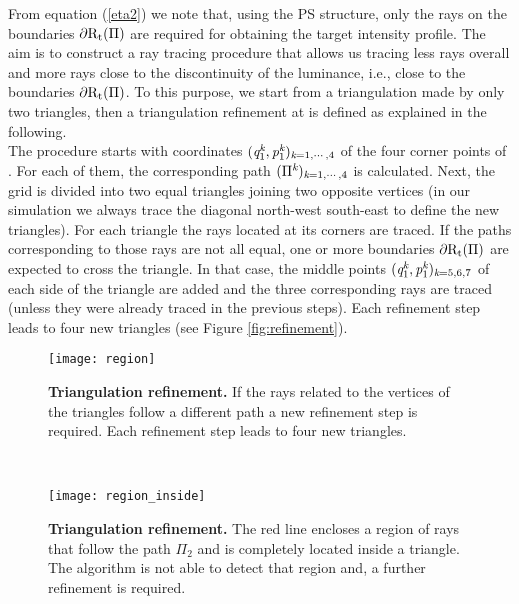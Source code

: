 From equation (\ref{eta2}) we note that, using the PS structure, only the rays on the boundaries $\partial\mbox{$\textup{R}$}_\textrm{t}(\Pi)$ are required for obtaining the target intensity profile.
The aim is to construct a ray tracing procedure that allows us tracing less rays overall and more rays close to the discontinuity of the luminance, i.e., close to the boundaries $\partial\mbox{$\textup{R}$}_\textrm{t}(\Pi)$.
To this purpose, we start from a triangulation made by only two triangles, then a triangulation refinement at  is defined as explained in the following. \\ \indent
The procedure starts with coordinates $(\textit{q}_1^{\textit{k}},\textit{p}_1^{\textit{k}})_{\textit{k}=1, \cdots, 4}$ of the four corner points of . For each of them, the corresponding path $(\Pi^{\textit{k}})_{\textit{k}=1, \cdots, 4}$ is calculated. Next, the grid is divided into two equal triangles joining two opposite vertices (in our simulation we always trace the diagonal north-west south-east to define the new triangles). For each triangle the rays located at its corners are traced. If the paths corresponding to
those rays are not all equal, one or more boundaries
$\partial\mbox{$\textup{R}$}_\textrm{t}(\Pi)$ are expected to cross the triangle.
In that case, the middle points $(\textit{q}_1^{\textit{k}},\textit{p}_1^{\textit{k}})_{\textit{k}=5,6,7}$ of each side of the triangle are added and
the three corresponding rays are traced (unless they were already traced in the previous steps). Each refinement step leads to four new triangles (see Figure \ref{fig:refinement}).
 \begin{figure}[h]
 \begin{minipage}[h]{\textwidth}
\centering
    \texttt{[image: region]}
  \caption{\textbf{Triangulation refinement.} If the rays related to the vertices of the triangles follow a different path a new refinement step is required.
   Each refinement step leads to four new triangles.}
  \label{fig:refinement}
\end{minipage}\\
\begin{minipage}[h]{\textwidth}
\centering
    \texttt{[image: region\_inside]}
  \caption{\textbf{Triangulation refinement.} The red line encloses a region of rays that follow the path $\Pi_2$ and is completely located inside a triangle.
  The algorithm is not able to detect that region and, a further refinement is required.}
   \label{fig:region inside}
\end{minipage}
  \end{figure} \\ \indent
